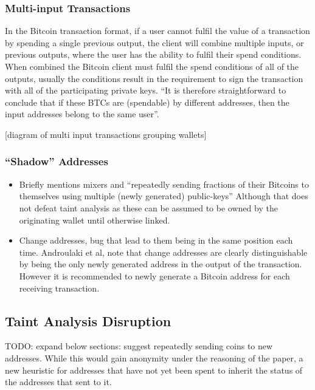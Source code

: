 \subsubsection{Multi-input Transactions}
In the Bitcoin transaction format, if a user cannot fulfil the value of a transaction by spending a single previous output, the client will combine multiple inputs, or previous outputs, where the user has the ability to fulfil their spend conditions.  When combined the Bitcoin client must fulfil the spend conditions of all of the outputs, usually the conditions result in the requirement to sign the transaction with all of the participating private keys.  ``It is therefore straightforward to conclude that if these BTCs are (spendable) by different addresses, then the input addresses belong to the same user''\cite{eval-priv}.

[diagram of multi input transactions grouping wallets]

\subsubsection{``Shadow'' Addresses}


\begin{itemize} \item Briefly mentions mixers and ``repeatedly sending fractions
        of their Bitcoins to themselves using multiple (newly generated)
    public-keys'' Although that does not defeat taint analysis as these can be
assumed to be owned by the originating wallet until otherwise linked.  \item
    Change addresses, bug that lead to them being in the same position each
    time.  Androulaki et al, note that change addresses are clearly
    distinguishable by being the only newly generated address in the output of
    the transaction.  However it is recommended to newly generate a Bitcoin
    address for each receiving transaction.  \end{itemize}


\subsection{Taint Analysis Disruption}
TODO: expand below sections:
\textcite{reid-anon} suggest repeatedly sending coins to new addresses. While this would gain anonymity under the reasoning of the paper, a new heuristic for addresses that have not yet been spent to inherit the status of the addresses that sent to it.


